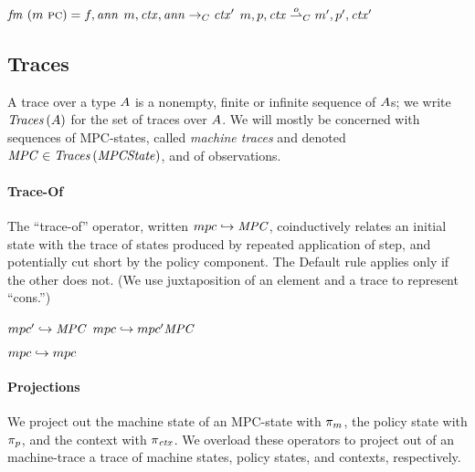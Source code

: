 \documentclass[acmsmall,review,anonymous]{acmart}\settopmatter{printfolios=true,printccs=false,printacmref=false}
\begin{document}
              {\(\codemap ~ (\mach ~ \PCname) = \funid, \ann\)}
              {\(\mach, \context, \ann \constep \context'\)}
              {\(\mpcstate{\mach}{\pol}{\context} \stepstocon[\obs]
                \mpcstate{\mach'}{\pol'}{\context'}\)}

\subsection{Traces}
\label{sec:traces}

A trace over a type \(\TRACEELEMS\) is a nonempty, finite or infinite sequence of
\(\TRACEELEMS\)s; we write \(\TRACE{\TRACEELEMS}\) for the set of traces over
\(\TRACEELEMS\). We will mostly be concerned with sequences of MPC-states,
called \emph{machine traces} and denoted \(\MPCT \in \TRACE{\MPCS}\), and of observations.

\paragraph*{Trace-Of}

The ``trace-of'' operator, written \(\mpcstatename \hookrightarrow \MPCT\),
coinductively relates an initial state with the trace of states
produced by repeated application of step, and potentially cut short by
the policy component. The {\sc Default} rule applies only if the other does not.
(We use juxtaposition of an element and a trace to represent ``cons.'')

\begin{minipage}{.4\textwidth}
            {\(\mpcstatename' \hookrightarrow \MPCT\)}
            {\(\mpcstatename \hookrightarrow \mpcstatename' \MPCT\)}%
\end{minipage}
\begin{minipage}{.4\textwidth}
\judgment[Default]
         {}
         {\(\mpcstatename \hookrightarrow \mpcstatename\)}
\end{minipage}
%

\paragraph*{Projections}

We project out the machine state of an MPC-state with \(\pi_\mach\), the
policy state with \(\pi_\pol\), and the context with \(\pi_\context\). We overload
these operators to project out of an machine-trace a trace of machine states,
policy states, and contexts, respectively.
\end{document}
